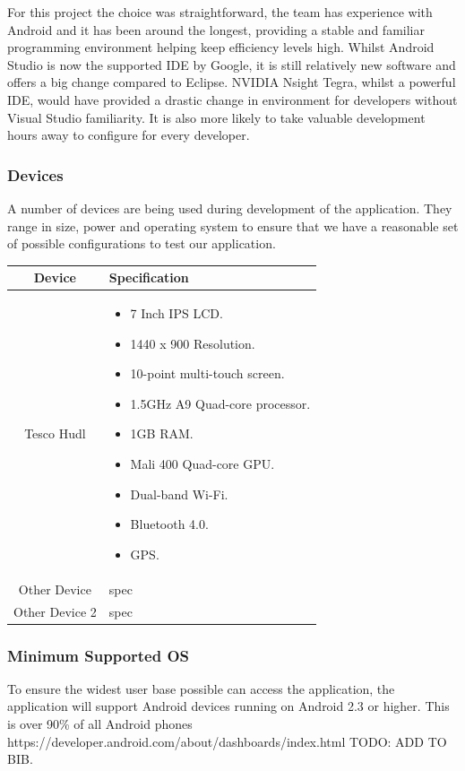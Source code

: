 \documentclass[11pt,a4paper]{article}
\begin{document}
For this project the choice was straightforward, the team has experience with Android and it has been around the longest, providing a stable and familiar programming environment helping keep efficiency levels high. Whilst Android Studio is now the supported IDE by Google, it is still relatively new software and offers a big change compared to Eclipse. NVIDIA Nsight Tegra, whilst a powerful IDE, would have provided a drastic change in environment for developers without Visual Studio familiarity. It is also more likely to take valuable development hours away to configure for every developer.

\subsubsection{Devices}
A number of devices are being used during development of the application. They range in size, power and operating system to ensure that we have a reasonable set of possible configurations to test our application.

\begin{longtable}{c|p{8cm}}
\textbf{Device} & \textbf{Specification} \\ \hline
Tesco Hudl & \begin{itemize}
\item 7 Inch IPS LCD.
\item 1440 x 900 Resolution.
\item 10-point multi-touch screen.
\item 1.5GHz A9 Quad-core processor.
\item 1GB RAM.
\item Mali 400 Quad-core GPU.
\item Dual-band Wi-Fi.
\item Bluetooth 4.0.
\item GPS.
\end{itemize} \\ \hline
Other Device & spec \\ \hline
Other Device 2 & spec \\ \hline

\end{longtable}

\subsubsection{Minimum Supported OS}
To ensure the widest user base possible can access the application, the application will support Android devices running on Android 2.3 or higher. This is over 90\% of all Android phones https://developer.android.com/about/dashboards/index.html TODO: ADD TO BIB.
\end{document}
